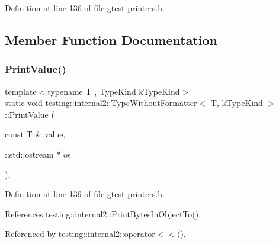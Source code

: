 Definition at line 136 of file gtest-\/printers.\+h.



\subsection{Member Function Documentation}
\mbox{\label{classtesting_1_1internal2_1_1TypeWithoutFormatter_a6651f6f7be2c0f899729eeb6038f76d3}} 
\subsubsection{\texorpdfstring{Print\+Value()}{PrintValue()}}
{\footnotesize\ttfamily template$<$typename T , Type\+Kind k\+Type\+Kind$>$ \\
static void \hyperlink{classtesting_1_1internal2_1_1TypeWithoutFormatter}{testing\+::internal2\+::\+Type\+Without\+Formatter}$<$ T, k\+Type\+Kind $>$\+::Print\+Value (\begin{DoxyParamCaption}\item[{const T \&}]{value,  }\item[{\+::std\+::ostream $\ast$}]{os }\end{DoxyParamCaption})\hspace{0.3cm}{\ttfamily [inline]}, {\ttfamily [static]}}



Definition at line 139 of file gtest-\/printers.\+h.



References testing\+::internal2\+::\+Print\+Bytes\+In\+Object\+To().



Referenced by testing\+::internal2\+::operator$<$$<$().


